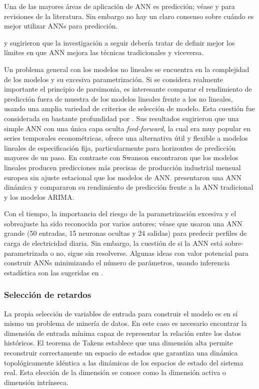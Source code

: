 \documentclass{llncs}
\begin{document}
Una de las mayores áreas de aplicación de ANN es predicción; véase \cite{Zhang199835} y \cite{Hippert200144} para revisiones de la literatura. Sin embargo no hay un claro consenso sobre cuándo es mejor utilizar ANNs para predicción.

\cite{Gorr19941} y \cite{Hill19945} sugirieron que la investigación a seguir debería tratar de definir mejor los límites en que ANN mejora las técnicas tradicionales y viceversa. 

Un problema general con los modelos no lineales se encuentra en la complejidad de los modelos y su excesiva parametrización. Si se considera realmente importante el principio de parsimonia, es interesante comparar el rendimiento de predicción fuera de muestra de los modelos lineales frente a los no lineales, usando una amplia variedad de criterios de selección de modelo. Esta cuestión fue considerada en bastante profundidad por \cite{Swanson1997439}. Sus resultados sugirieron que una simple ANN con una única capa oculta \emph{feed-forward}, la cual era muy popular en series temporales econométricas, ofrece una alternativa útil y flexible a modelos lineales de especificación fija, particularmente para horizontes de predicción mayores de un paso. En contraste con Swanson \cite{Heravi2004435} encontraron que los modelos lineales producen predicciones más precisas de producción industrial mensual europea sin ajuste estacional que los modelos de ANN. \cite{Ghiassi2005341} presentaron una ANN dinámica y compararon su rendimiento de predicción frente a la ANN tradicional y los modelos ARIMA.

Con el tiempo, la importancia del riesgo de la parametrización excesiva y el sobreajuste ha sido reconocida por varios autores; véase \cite{Hippert2005425} que usaron una ANN grande (50 entradas, 15 neuronas ocultas y 24 salidas) para predecir perfiles de carga de electricidad diaria. Sin embargo, la cuestión de si la ANN está sobre-parametrizada o no, sigue sin resolverse. Algunas ideas con valor potencial para construir ANNs minimizando el número de parámetros, usando inferencia estadística son las sugeridas en \cite{Terasvirta2005755}.

\subsubsection{Selección de retardos}

La propia selección de variables de entrada para construir el modelo es en sí mismo un problema de minería de datos. En este caso es necesario encontrar la dimensión de entrada mínima capaz de representar la relación entre los datos históricos. El teorema de Takens \cite{Takens1981366} establece que una dimensión alta permite reconstruir correctamente un espacio de estados que garantiza una dinámica topológicamente idéntica a las dinámicas de los espacios de estado del sistema real. Esta elección de la dimensión se conoce como la dimensión activa o dimensión intrínseca.
\end{document}
